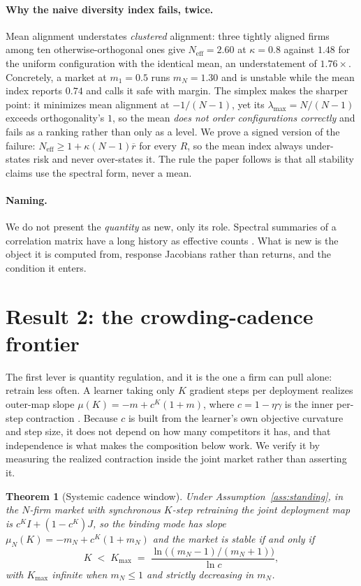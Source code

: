 \documentclass{article}
\theoremstyle{plain}
\newtheorem{theorem}{Theorem}
\theoremstyle{definition}
\newcommand{\Neff}{N_{\mathrm{eff}}}
\newcommand{\mN}{m_N}
\newcommand{\lmax}{\lambda_{\max}}
\begin{document}
\paragraph{Why the naive diversity index fails, twice.}
Mean alignment understates \emph{clustered} alignment: three tightly aligned firms among ten otherwise-orthogonal ones give $\Neff = 2.60$ at $\kappa=0.8$ against $1.48$ for the uniform configuration with the identical mean, an understatement of $1.76\times$. Concretely, a market at $m_1 = 0.5$ runs $\mN = 1.30$ and is unstable while the mean index reports $0.74$ and calls it safe with margin. The simplex makes the sharper point: it minimizes mean alignment at $-1/(N-1)$, yet its $\lmax = N/(N-1)$ exceeds orthogonality's $1$, so the mean \emph{does not order configurations correctly} and fails as a ranking rather than only as a level. We prove a signed version of the failure: $\Neff \geq 1 + \kappa(N-1)\overline{r}$ for every $R$, so the mean index always under-states risk and never over-states it. The rule the paper follows is that all stability claims use the spectral form, never a mean.

\paragraph{Naming.}
We do not present the \emph{quantity} as new, only its role. Spectral summaries of a correlation matrix have a long history as effective counts \citep{hill1973,roy2007,laloux1999}. What is new is the object it is computed from, response Jacobians rather than returns, and the condition it enters.

\section{Result 2: the crowding-cadence frontier}
\label{sec:cadence}

The first lever is quantity regulation, and it is the one a firm can pull alone: retrain less often. A learner taking only $K$ gradient steps per deployment realizes outer-map slope $\mu(K) = -m + c^K(1+m)$, where $c = 1-\eta\gamma$ is the inner per-step contraction \citep{mendlerdunner2020}. Because $c$ is built from the learner's own objective curvature and step size, it does not depend on how many competitors it has, and that independence is what makes the composition below work. We verify it by measuring the realized contraction inside the joint market rather than asserting it.

\begin{theorem}[Systemic cadence window]
\label{thm:cadence}
Under Assumption~\ref{ass:standing}, in the $N$-firm market with synchronous $K$-step retraining the joint deployment map is $c^K I + (1-c^K)J$, so the binding mode has slope $\mu_N(K) = -\mN + c^K(1+\mN)$ and the market is stable if and only if
\begin{equation}
K \;<\; K_{\max} \;=\; \frac{\ln\bigl((\mN-1)/(\mN+1)\bigr)}{\ln c},
\end{equation}
with $K_{\max}$ infinite when $\mN \le 1$ and strictly decreasing in $\mN$.
\end{theorem}
\end{document}
